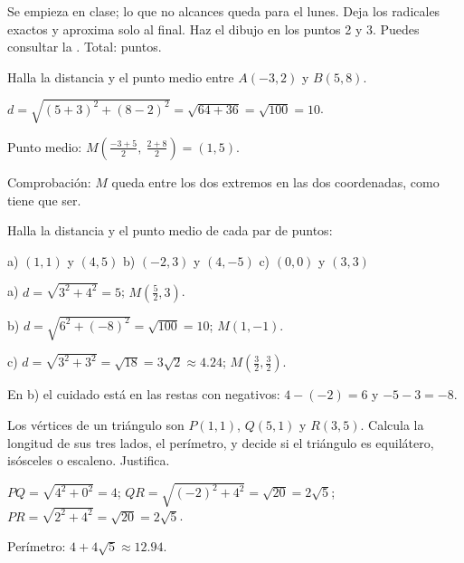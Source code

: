 \documentclass[11pt]{article}
\begin{document}
\encabezado

\begin{instrucciones}
Se empieza en clase; lo que no alcances queda para el lunes. Deja los radicales exactos y
aproxima solo al final. Haz el dibujo en los puntos 2 y 3. Puedes consultar la
. Total: \totalpuntos{} puntos.
\end{instrucciones}

\begin{preguntas}

\pregunta[1] Halla la distancia y el punto medio entre $A(-3, 2)$ y $B(5, 8)$.
\begin{solucion}[4cm]
$d = \sqrt{(5 + 3)^2 + (8 - 2)^2} = \sqrt{64 + 36} = \sqrt{100} = 10$.

Punto medio: $M\left(\frac{-3 + 5}{2},\ \frac{2 + 8}{2}\right) = (1, 5)$.

Comprobación: $M$ queda entre los dos extremos en las dos coordenadas, como tiene que ser.
\end{solucion}

\pregunta[1.5] Halla la distancia y el punto medio de cada par de puntos:

\begin{center}
a) $(1, 1)$ y $(4, 5)$ \qquad b) $(-2, 3)$ y $(4, -5)$ \qquad c) $(0, 0)$ y $(3, 3)$
\end{center}
\begin{solucion}[5cm]
a) $d = \sqrt{3^2 + 4^2} = 5$; \quad $M\left(\frac{5}{2}, 3\right)$.

b) $d = \sqrt{6^2 + (-8)^2} = \sqrt{100} = 10$; \quad $M(1, -1)$.

c) $d = \sqrt{3^2 + 3^2} = \sqrt{18} = 3\sqrt{2} \approx \num{4,24}$; \quad
$M\left(\frac{3}{2}, \frac{3}{2}\right)$.

En b) el cuidado está en las restas con negativos: $4 - (-2) = 6$ y $-5 - 3 = -8$.
\end{solucion}

\pregunta[1.5] Los vértices de un triángulo son $P(1, 1)$, $Q(5, 1)$ y $R(3, 5)$. Calcula la
longitud de sus tres lados, el perímetro, y decide si el triángulo es equilátero, isósceles o
escaleno. Justifica.
\begin{solucion}[5.5cm]
$PQ = \sqrt{4^2 + 0^2} = 4$; \quad $QR = \sqrt{(-2)^2 + 4^2} = \sqrt{20} = 2\sqrt{5}$; \quad
$PR = \sqrt{2^2 + 4^2} = \sqrt{20} = 2\sqrt{5}$.

Perímetro: $4 + 4\sqrt{5} \approx \num{12,94}$.


\end{solucion}
\end{preguntas}
\end{document}
